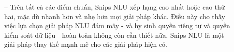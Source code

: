 \begin{itemize}
        \item[--]Trên tất cả các điểm chuẩn, Snips NLU xếp hạng cao nhất hoặc cao thứ hai, mặc dù nhanh hơn và nhẹ hơn mọi giải pháp khác. Điều này cho thấy việc lựa chọn giải pháp NLU đám mây - và hy sinh quyền riêng tư và quyền kiểm soát dữ liệu - hoàn toàn không còn cần thiết nữa. Snips NLU là một giải pháp thay thế mạnh mẽ cho các giải pháp hiện có.



\end{itemize}